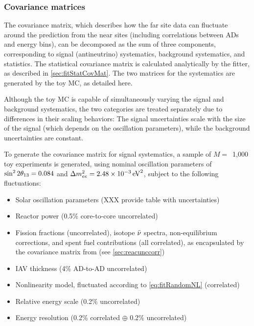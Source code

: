 \documentclass[../thesis.tex]{subfiles}
\begin{document}
\subsubsection{Covariance matrices}

The covariance matrix, which describes how the far site data can fluctuate around the prediction from the near sites (including correlations between ADs and energy bins), can be decomposed as the sum of three components, corresponding to signal (antineutrino) systematics, background systematics, and statistics. The statistical covariance matrix is calculated analytically by the fitter, as described in \autoref{sec:fitStatCovMat}. The two matrices for the systematics are generated by the toy MC, as detailed here.

Although the toy MC is capable of simultaneously varying the signal and background systematics, the two categories are treated separately due to differences in their scaling behaviors: The signal uncertainties scale with the size of the signal (which depends on the oscillation parameters), while the background uncertainties are constant.

To generate the covariance matrix for signal systematics, a sample of $M =$~1,000 toy experiments is generated, using nominal oscillation parameters of $\sin^2 2\theta_{13} = 0.084$ and $\Delta m^2_{ee} = \SI{2.48e-3}{eV^2}$, subject to the following fluctuations:

\begin{itemize}
\item Solar oscillation parameters (XXX provide table with uncertainties)
\item Reactor power (0.5\% core-to-core uncorrelated)
\item Fission fractions (uncorrelated), isotope $\bar\nu$ spectra, non-equilibrium corrections, and spent fuel contributions (all correlated), as encapsulated by the covariance matrix from \cite{Lewis} (see \autoref{sec:reacunccorr})
\item IAV thickness (4\% AD-to-AD uncorrelated)
\item Nonlinearity model, fluctuated according to \autoref{eq:fitRandomNL} (correlated)
\item Relative energy scale (0.2\% uncorrelated)
\item Energy resolution (0.2\% correlated $\oplus$ 0.2\% uncorrelated)
\end{itemize}
\end{document}
